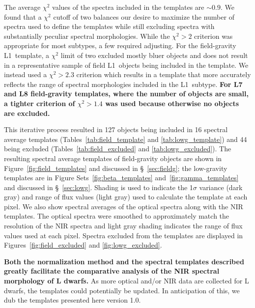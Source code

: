 \documentclass[12pt]{aastex6}
\begin{document}
The average $\chi^2$ values of the spectra included in the templates are $\sim0.9$.
We found that a $\chi^2$ cutoff of two balances our desire to maximize the number of spectra used to define the templates while still excluding spectra with substantially peculiar spectral morphologies.
While the $\chi^2 > 2$ criterion was appropriate for most subtypes, a few required adjusting.
For the field-gravity L1~template, a $\chi^2$ limit of two excluded mostly bluer objects and does not result in a representative sample of field L1~objects being included in the template.
We instead used a $\chi^2 > 2.3$ criterion which results in a template that more accurately reflects the range of spectral morphologies included in the L1~subtype.
\textbf{For L7 and L8 field-gravity templates, where the number of objects are small, a tighter criterion of $\chi^2 > 1.4$ was used because otherwise no objects are excluded.}

This iterative process resulted in 127 objects being included in 16 spectral average templates (Tables~\ref{tab:field_template} and \ref{tab:lowg_template}) and 44 being excluded (Tables~\ref{tab:field_excluded} and \ref{tab:lowg_excluded}).
The resulting spectral average templates of field-gravity objects are shown in Figure~\ref{fig:field_templates} and discussed in \S~\ref{sec:fieldg}; the low-gravity templates are in Figure Sets~\ref{fig:beta_templates} and~\ref{fig:gamma_templates} and discussed in \S~\ref{sec:lowg}.
Shading is used to indicate the 1$\sigma$ variance (dark gray) and range of flux values (light gray) used to calculate the template at each pixel.
We also show spectral averages of the optical spectra along with the NIR templates. The optical spectra were smoothed to approximately match the resolution of the NIR spectra and light gray shading indicates the range of flux values used at each pixel.
Spectra excluded from the templates are displayed in Figures~\ref{fig:field_excluded} and \ref{fig:lowg_excluded}.

\textbf{Both the normalization method and the spectral templates described greatly facilitate the comparative analysis of the NIR spectral morphology of L dwarfs.}
As more optical and/or NIR data are collected for L dwarfs, the templates could potentially be updated.
In anticipation of this, we dub the templates presented here version 1.0.
\end{document}
